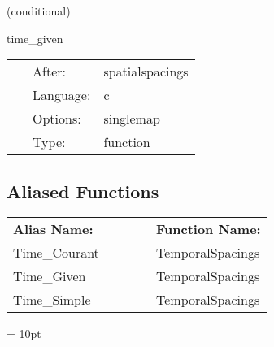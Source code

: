\vspace{5mm}

   (conditional) 

\hspace{5mm} time\_given 

\hspace{5mm}{\it set fixed timestep } 


\hspace{5mm}

 \begin{tabular*}{160mm}{cll} 
~ & After:  & spatialspacings \\ 
~ & Language:  & c \\ 
~ & Options:  & singlemap \\ 
~ & Type:  & function \\ 
\end{tabular*} 


\subsection*{Aliased Functions}

\hspace{5mm}

 \begin{tabular*}{160mm}{ll} 

{\bf Alias Name:} ~~~~~~~ & {\bf Function Name:} \\ 
Time\_Courant & TemporalSpacings \\ 
Time\_Given & TemporalSpacings \\ 
Time\_Simple & TemporalSpacings \\ 
\end{tabular*} 



\vspace{5mm}\parskip = 10pt 
